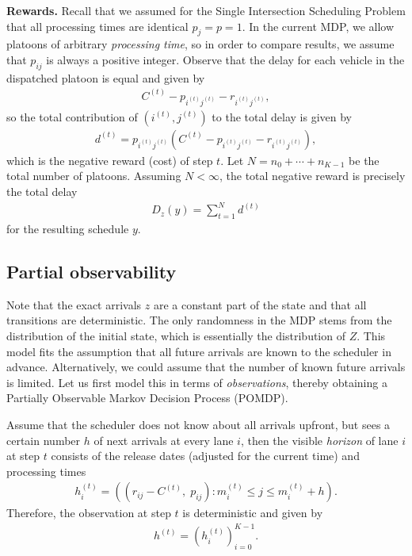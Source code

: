 \documentclass{article}
\theoremstyle{definition}
\theoremstyle{plain}
\begin{document}
\noindent
\textbf{Rewards.} Recall that we assumed for the Single Intersection Scheduling Problem
that all processing times are identical $p_{j} = p = 1$. In the current MDP, we
allow platoons of arbitrary \textit{processing time}, so in order to compare
results, we assume that $p_{ij}$ is always a positive integer.
%
Observe that the delay for each vehicle in the dispatched platoon
is equal and given by
\begin{align}
  C^{(t)} - p_{i^{(t)}j^{(t)}} - r_{i^{(t)}j^{(t)}} ,
\end{align}
so the total contribution of $(i^{(t)},j^{(t)})$ to the total delay is given by
\begin{align}
  d^{(t)} = p_{i^{(t)}j^{(t)}} ( C^{(t)} - p_{i^{(t)}j^{(t)}} - r_{i^{(t)}j^{(t)}}) ,
\end{align}
which is the negative reward (cost) of step $t$. Let $N = n_{0} + \cdots + n_{K-1}$ be
the total number of platoons. Assuming $N < \infty$, the total negative reward is
precisely the total delay
\begin{align}
  D_{z}(y) = \sum_{t=1}^{N} d^{(t)}
\end{align}
for the resulting schedule $y$.

\subsection{Partial observability}

Note that the exact arrivals $z$ are a constant part of the state and that all
transitions are deterministic. The only randomness in the MDP stems from the
distribution of the initial state, which is essentially the distribution of $Z$.
This model fits the assumption that all future arrivals are known to the
scheduler in advance. Alternatively, we could assume that the number of known
future arrivals is limited. Let us first model this in terms of
\textit{observations}, thereby obtaining a Partially Observable Markov Decision
Process (POMDP).

Assume that the scheduler does not know about all arrivals upfront, but sees a
certain number $h$ of next arrivals at every lane $i$, then the visible \textit{horizon}
of lane $i$ at step $t$ consists of the release dates (adjusted for the current
time) and processing times
\begin{align}
  \label{eq:observations}
  h_{i}^{(t)} = \left( (r_{ij} - C^{(t)}, \; p_{ij})  : m_{i}^{(t)} \leq j \leq m_{i}^{(t)} + h \right) .
\end{align}
Therefore, the observation at step $t$ is deterministic and given by
\begin{align}
  h^{(t)} = {( h_{i}^{(t)} )}_{i=0}^{K-1} .
\end{align}
\end{document}
